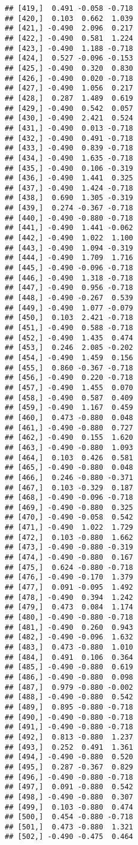 \documentclass[
]{article}
\begin{document}
\begin{verbatim}
## [419,]  0.491 -0.058 -0.718
## [420,]  0.103  0.662  1.039
## [421,] -0.490  2.096  0.217
## [422,] -0.490  0.581  1.224
## [423,] -0.490  1.188 -0.718
## [424,]  0.527 -0.096 -0.153
## [425,] -0.490  0.320  0.830
## [426,] -0.490  0.020 -0.718
## [427,] -0.490  1.056  0.217
## [428,]  0.287  1.489  0.619
## [429,] -0.490  0.542  0.057
## [430,] -0.490  2.421  0.524
## [431,] -0.490  0.013 -0.718
## [432,] -0.490  0.491 -0.718
## [433,] -0.490  0.839 -0.718
## [434,] -0.490  1.635 -0.718
## [435,] -0.490  0.106 -0.319
## [436,] -0.490  1.441  0.325
## [437,] -0.490  1.424 -0.718
## [438,]  0.690  1.305 -0.319
## [439,]  0.274 -0.367 -0.718
## [440,] -0.490 -0.880 -0.718
## [441,] -0.490  1.441 -0.062
## [442,] -0.490  1.022  1.100
## [443,] -0.490  1.094 -0.319
## [444,] -0.490  1.709  1.716
## [445,] -0.490 -0.096 -0.718
## [446,] -0.490  1.318 -0.718
## [447,] -0.490  0.956 -0.718
## [448,] -0.490 -0.267  0.539
## [449,] -0.490  1.077 -0.079
## [450,]  0.103  2.421 -0.718
## [451,] -0.490  0.588 -0.718
## [452,] -0.490  1.435  0.474
## [453,]  0.246  2.085 -0.202
## [454,] -0.490  1.459  0.156
## [455,]  0.860 -0.367 -0.718
## [456,] -0.490  0.220 -0.718
## [457,] -0.490  1.455  0.070
## [458,] -0.490  0.587  0.409
## [459,] -0.490  1.167  0.459
## [460,]  0.473 -0.880  0.048
## [461,] -0.490 -0.880  0.727
## [462,] -0.490  0.155  1.620
## [463,] -0.490 -0.880  1.093
## [464,]  0.103  0.426  0.581
## [465,] -0.490 -0.880  0.048
## [466,]  0.246 -0.880 -0.371
## [467,]  0.103 -0.329  0.187
## [468,] -0.490 -0.096 -0.718
## [469,] -0.490 -0.880  0.325
## [470,] -0.490 -0.058  0.542
## [471,] -0.490  1.022  1.729
## [472,]  0.103 -0.880  1.662
## [473,] -0.490 -0.880 -0.319
## [474,] -0.490 -0.880  0.167
## [475,]  0.624 -0.880 -0.718
## [476,] -0.490 -0.170  1.379
## [477,]  0.091 -0.095  1.492
## [478,] -0.490  0.394  1.242
## [479,]  0.473  0.084  1.174
## [480,] -0.490 -0.880 -0.718
## [481,] -0.490  0.260  0.943
## [482,] -0.490 -0.096  1.632
## [483,]  0.473 -0.880  1.010
## [484,]  0.491  0.106  0.364
## [485,] -0.490 -0.880  0.619
## [486,] -0.490 -0.880  0.098
## [487,]  0.979 -0.880 -0.002
## [488,] -0.490 -0.880  0.542
## [489,]  0.895 -0.880 -0.718
## [490,] -0.490 -0.880 -0.718
## [491,] -0.490 -0.880 -0.718
## [492,]  0.813 -0.880  1.237
## [493,]  0.252  0.491  1.361
## [494,] -0.490 -0.880  0.520
## [495,]  0.287 -0.367  0.829
## [496,] -0.490 -0.880 -0.718
## [497,]  0.091 -0.880  0.542
## [498,] -0.490 -0.880  0.307
## [499,]  0.103 -0.880  0.474
## [500,]  0.454 -0.880 -0.718
## [501,]  0.473 -0.880  1.321
## [502,] -0.490 -0.475  0.464

\end{verbatim}
\end{document}
